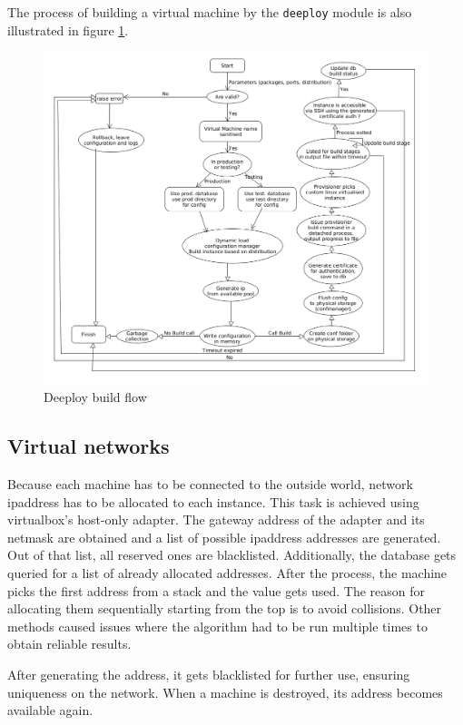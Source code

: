 \documentclass{article}
\begin{document}
The process of building a virtual machine by the \texttt{deeploy} module is also illustrated in figure \ref{fig:deeploy-build-flow}.

\begin{figure}[h!]
	\vspace{0.5cm}
	\includegraphics[width=12cm]{build-flow.png}
	\vspace{0.5cm}
	\caption{Deeploy build flow}
	\label{fig:deeploy-build-flow}
\end{figure}

\subsection{Virtual networks}
Because each machine has to be connected to the outside world, network \gls{ipaddress} has to be allocated to each instance. This task is achieved using \gls{virtualbox}'s host-only adapter. The gateway address of the adapter and its \gls{netmask} are obtained and a list of possible \gls{ipaddress} addresses are generated. Out of that list, all reserved ones are blacklisted. Additionally, the database gets queried for a list of already allocated addresses. After the process, the machine picks the first address from a stack and the value gets used.
The reason for allocating them sequentially starting from the top is to avoid collisions. Other methods caused issues where the algorithm had to be run multiple times to obtain reliable results.

After generating the address, it gets blacklisted for further use, ensuring uniqueness on the network. When a machine is destroyed, its address becomes available again.
\end{document}
